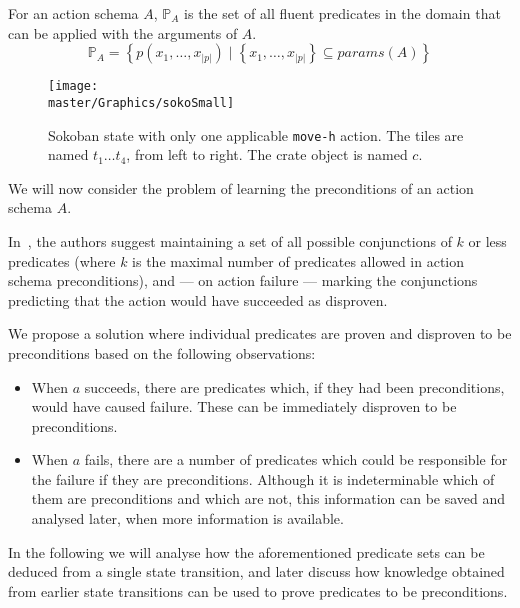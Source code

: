 \documentclass[../Master.tex]{subfiles}
\providecommand{\master}{..}
\begin{document}
For an action schema $A$, $\mathbb{P}_A$ is the set of all fluent predicates in the domain that can be applied with the arguments of $A$.
\[
    \mathbb{P}_A = \left\{
        p \left( x_1, \dots, x_{|p|} \right)
        \; | \; \left\{ x_1, \dots, x_{|p|} \right\} \subseteq params(A)
    \right\}
\]

\begin{figure}
    \centering
    \texttt{[image: \\master/Graphics/sokoSmall]}
    \caption{\label{fig:sokoSmall} Sokoban state with only one applicable \texttt{move-h} action. The tiles are named $t_1 \dots t_4$, from left to right. The crate object is named $c$.}
\end{figure}

We will now consider the problem of learning the preconditions of an action schema $A$.

In~\cite{Walsh2008}, the authors suggest maintaining a set of all possible conjunctions of $k$ or less predicates (where $k$ is the maximal number of predicates allowed in action schema preconditions), and --- on action failure --- marking the conjunctions predicting that the action would have succeeded as disproven.

We propose a solution where individual predicates are proven and disproven to be preconditions based on the following observations:
\begin{itemize}
    \item When $a$ succeeds, there are predicates which, if they had been preconditions, would have caused failure. These can be immediately disproven to be preconditions.
    \item When $a$ fails, there are a number of predicates which could be responsible for the failure if they are preconditions. Although it is indeterminable which of them are preconditions and which are not, this information can be saved and analysed later, when more information is available.
\end{itemize}

In the following we will analyse how the aforementioned predicate sets can be deduced from a single state transition, and later discuss how knowledge obtained from earlier state transitions can be used to prove predicates to be preconditions.
\end{document}
